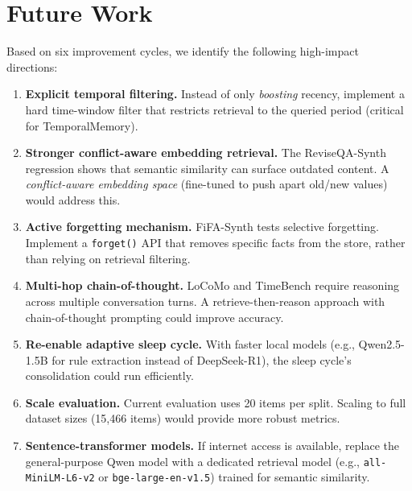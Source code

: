\documentclass[11pt,a4paper]{article}
\begin{document}
\section{Future Work}
\label{sec:future}

Based on six improvement cycles, we identify the following high-impact
directions:

\begin{enumerate}
    \item \textbf{Explicit temporal filtering.}  Instead of only
          \emph{boosting} recency, implement a hard time-window filter that
          restricts retrieval to the queried period (critical for
          TemporalMemory).

    \item \textbf{Stronger conflict-aware embedding retrieval.}
          The ReviseQA-Synth regression shows that semantic similarity can
          surface outdated content.  A \emph{conflict-aware embedding space}
          (fine-tuned to push apart old/new values) would address this.

    \item \textbf{Active forgetting mechanism.}  FiFA-Synth tests selective
          forgetting.  Implement a \texttt{forget()} API that removes specific
          facts from the store, rather than relying on retrieval filtering.

    \item \textbf{Multi-hop chain-of-thought.}  LoCoMo and TimeBench require
          reasoning across multiple conversation turns.  A retrieve-then-reason
          approach with chain-of-thought prompting could improve accuracy.

    \item \textbf{Re-enable adaptive sleep cycle.}  With faster local models
          (e.g., Qwen2.5-1.5B for rule extraction instead of DeepSeek-R1),
          the sleep cycle's consolidation could run efficiently.

    \item \textbf{Scale evaluation.}  Current evaluation uses 20 items per
          split.  Scaling to full dataset sizes (15{,}466 items) would provide
          more robust metrics.

    \item \textbf{Sentence-transformer models.}  If internet access is
          available, replace the general-purpose Qwen model with a dedicated
          retrieval model (e.g., \texttt{all-MiniLM-L6-v2} or
          \texttt{bge-large-en-v1.5}) trained for semantic similarity.
\end{enumerate}
\end{document}
